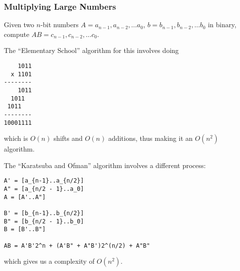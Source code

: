 \documentclass[12pt]{article}
\begin{document}
\subsubsection{Multiplying Large Numbers}
Given two $n$-bit numbers $A = a_{n-1}, a_{n-2}, \dots a_0$, $b = b_{n-1}, b_{n-2}, \dots b_0$ in binary, compute $AB = c_{n-1}, c_{n-2}, \dots c_0$.

The ``Elementary School'' algorithm for this involves doing
\begin{verbatim}
    1011
  x 1101
--------
    1011
  1011
 1011
--------
10001111
\end{verbatim}
which is $O(n)$ shifts and $O(n)$ additions, thus making it an $O(n^2)$ algorithm.

The ``Karatsuba and Ofman'' algorithm involves a different process:
\begin{verbatim}
A' = [a_{n-1}..a_{n/2}]
A" = [a_{n/2 - 1}..a_0]
A = [A'..A"]

B' = [b_{n-1}..b_{n/2}]
B" = [b_{n/2 - 1}..b_0]
B = [B'..B"]

AB = A'B'2^n + (A'B" + A"B')2^(n/2) + A"B"
\end{verbatim}
which gives us a complexity of $O(n^2)$.
\end{document}
